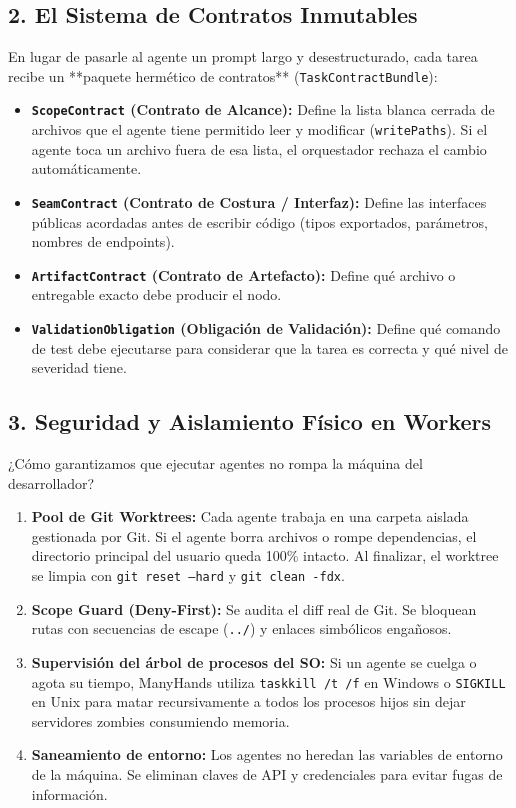 \documentclass[11pt,a4paper]{article}
\begin{document}
\subsection{2. El Sistema de Contratos Inmutables}
En lugar de pasarle al agente un prompt largo y desestructurado, cada tarea recibe un **paquete hermético de contratos** (\texttt{TaskContractBundle}):
\begin{itemize}
  \item \textbf{\texttt{ScopeContract} (Contrato de Alcance):} Define la lista blanca cerrada de archivos que el agente tiene permitido leer y modificar (\texttt{writePaths}). Si el agente toca un archivo fuera de esa lista, el orquestador rechaza el cambio automáticamente.
  \item \textbf{\texttt{SeamContract} (Contrato de Costura / Interfaz):} Define las interfaces públicas acordadas antes de escribir código (tipos exportados, parámetros, nombres de endpoints).
  \item \textbf{\texttt{ArtifactContract} (Contrato de Artefacto):} Define qué archivo o entregable exacto debe producir el nodo.
  \item \textbf{\texttt{ValidationObligation} (Obligación de Validación):} Define qué comando de test debe ejecutarse para considerar que la tarea es correcta y qué nivel de severidad tiene.
\end{itemize}

\subsection{3. Seguridad y Aislamiento Físico en Workers}
¿Cómo garantizamos que ejecutar agentes no rompa la máquina del desarrollador?
\begin{enumerate}
  \item \textbf{Pool de Git Worktrees:} Cada agente trabaja en una carpeta aislada gestionada por Git. Si el agente borra archivos o rompe dependencias, el directorio principal del usuario queda 100\% intacto. Al finalizar, el worktree se limpia con \texttt{git reset --hard} y \texttt{git clean -fdx}.
  \item \textbf{Scope Guard (Deny-First):} Se audita el diff real de Git. Se bloquean rutas con secuencias de escape (\texttt{../}) y enlaces simbólicos engañosos.
  \item \textbf{Supervisión del árbol de procesos del SO:} Si un agente se cuelga o agota su tiempo, ManyHands utiliza \texttt{taskkill /t /f} en Windows o \texttt{SIGKILL} en Unix para matar recursivamente a todos los procesos hijos sin dejar servidores zombies consumiendo memoria.
  \item \textbf{Saneamiento de entorno:} Los agentes no heredan las variables de entorno de la máquina. Se eliminan claves de API y credenciales para evitar fugas de información.
\end{enumerate}
\end{document}
